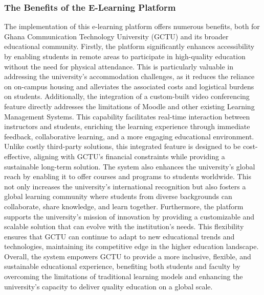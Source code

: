 \documentclass[a4paper,12pt]{article}  %
\begin{document}
\subsubsection{The Benefits of the E-Learning Platform}
The implementation of this e-learning platform offers numerous benefits, both for Ghana Communication Technology University (GCTU) and its broader educational community. Firstly, the platform significantly enhances accessibility by enabling students in remote areas to participate in high-quality education without the need for physical attendance. This is particularly valuable in addressing the university's accommodation challenges, as it reduces the reliance on on-campus housing and alleviates the associated costs and logistical burdens on students. Additionally, the integration of a custom-built video conferencing feature directly addresses the limitations of Moodle and other existing Learning Management Systems. This capability facilitates real-time interaction between instructors and students, enriching the learning experience through immediate feedback, collaborative learning, and a more engaging educational environment. Unlike costly third-party solutions, this integrated feature is designed to be cost-effective, aligning with GCTU's financial constraints while providing a sustainable long-term solution. The system also enhances the university’s global reach by enabling it to offer courses and programs to students worldwide. This not only increases the university's international recognition but also fosters a global learning community where students from diverse backgrounds can collaborate, share knowledge, and learn together. Furthermore, the platform supports the university’s mission of innovation by providing a customizable and scalable solution that can evolve with the institution's needs. This flexibility ensures that GCTU can continue to adapt to new educational trends and technologies, maintaining its competitive edge in the higher education landscape. Overall, the system empowers GCTU to provide a more inclusive, flexible, and sustainable educational experience, benefiting both students and faculty by overcoming the limitations of traditional learning models and enhancing the university's capacity to deliver quality education on a global scale.\\
\end{document}
